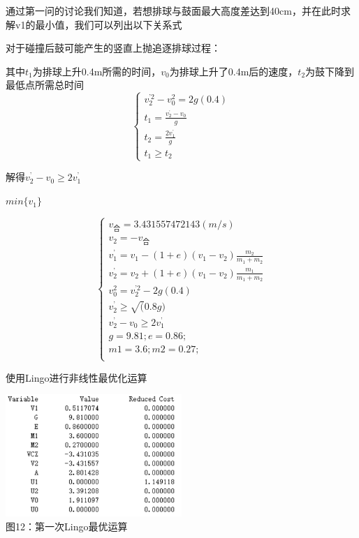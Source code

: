 \documentclass[UTF8]{article}
\begin{document}
通过第一问的讨论我们知道，若想排球与鼓面最大高度差达到40cm，并在此时求解v1的最小值，我们可以列出以下关系式

对于碰撞后鼓可能产生的竖直上抛追逐排球过程：

其中$t_1$为排球上升0.4m所需的时间，$v_0$为排球上升了0.4m后的速度，$t_2$为鼓下降到最低点所需总时间
\begin{equation}
    \begin{cases}
        v_2^{\mbox{'2}}-v_0^2=2g(0.4)\\
        t_1=\frac{ v_2^{\mbox{'}}-v_0}{g}\\
        t_2=\frac{2v_1^{\mbox{'}}}{g}\\
        t_1\ge t_2
    \end{cases}
\end{equation}

解得$ v_2^{\mbox{'}}-v_0\ge 2v_1^{\mbox{'}}$
\begin{center}
    $min \{ v_1 \}$    
\end{center}
\begin{equation}
    \begin{cases}
        v_{\mbox{合}}=3.431557472143(m/s)\\
        v_2=-v_{\mbox{合}}\\
        v_1^{\mbox{'}}=v_1-(1+e)(v_1-v_2)\frac{m_2}{m_1+m_2}\\
        v_2^{\mbox{'}}=v_2+(1+e)(v_1-v_2)\frac{m_1}{m_1+m_2}\\
        v_0^2=v_2^{\mbox{'2}}-2g(0.4)\\
        v_2^{\mbox{'}}\ge\sqrt(0.8g)\\
        v_2^{\mbox{'}}-v_0\ge 2v_1^{\mbox{'}}\\
        g=9.81; e=0.86; \\
        m1=3.6; m2=0.27;\\
    \end{cases}
\end{equation}

使用Lingo进行非线性最优化运算

\begin{center}
    \includegraphics[width=0.5\textwidth]{figure8.png}\\ 
    图12：第一次Lingo最优运算
\end{center}
\end{document}
